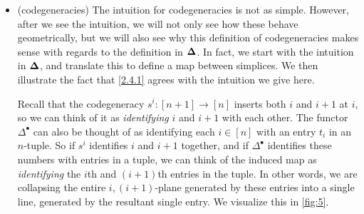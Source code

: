 \begin{intuition}
\begin{itemize}
        \item (codegeneracies) The intuition for codegeneracies is not as simple. However, after we see the intuition, we will not only see how these behave geometrically, but we will also see why this definition of codegeneracies makes sense with regards to the definition in $\boldsymbol{\Delta}$. In fact, we start with the intuition in $\boldsymbol{\Delta}$, and translate this to define a map between simplices. We then illustrate the fact that \cref{2.4.1} agrees with the intuition we give here.

        Recall that the codegeneracy $s^i : [n+1]\to[n]$ inserts both $i$ and $i+1$ at $i$, so we can think of it as \emph{identifying} $i$ and $i+1$ with each other. The functor $\Delta^\bullet$ can also be thought of as identifying each $i\in[n]$ with an entry $t_i$ in an $n$-tuple. So if $s^i$ identifies $i$ and $i+1$ together, and if $\Delta^\bullet$ identifies these numbers with entries in a tuple, we can think of the induced map as \emph{identifying} the $i$th and $(i+1)$th entries in the tuple. In other words, we are collapsing the entire $i,(i+1)$-plane generated by these entries into a single line, generated by the resultant single entry. We visualize this in \cref{fig:5}.
        
        \begin{figure}[ht]
            \centering
\end{figure}
\end{itemize}
\end{intuition}
